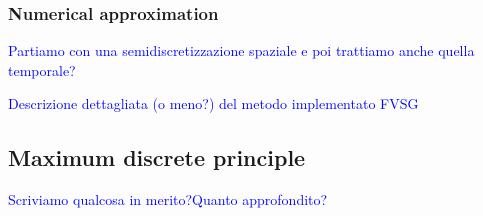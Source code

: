 \subsubsection{Numerical approximation}

  
\textcolor{blue}{Partiamo con una semidiscretizzazione spaziale e poi trattiamo anche quella temporale?}

\textcolor{blue}{Descrizione dettagliata (o meno?) del metodo implementato FVSG}

\subsection{Maximum discrete principle}
\textcolor{blue}{Scriviamo qualcosa in merito?Quanto approfondito?}




